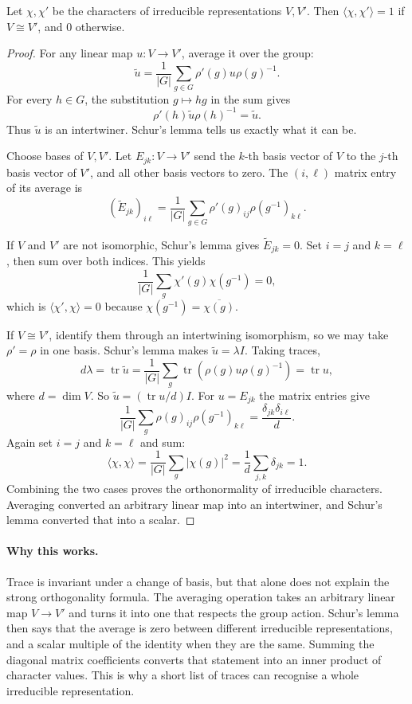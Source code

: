 \begin{theorem}\label{thm:orth}
Let $\chi,\chi'$ be the characters of irreducible representations $V,V'$. Then $\langle\chi,\chi'\rangle=1$ if $V\cong V'$, and $0$ otherwise.
\end{theorem}
\begin{proof}
For any linear map $u:V\to V'$, average it
over the group:
\[
\widetilde u=\frac1{|G|}
\sum_{g\in G}\rho'(g)u\rho(g)^{-1}.
\]
For every $h\in G$, the substitution
$g\mapsto hg$ in the sum gives
\[
\rho'(h)\widetilde u\rho(h)^{-1}=\widetilde u.
\]
Thus $\widetilde u$ is an intertwiner.
Schur's lemma tells us exactly what
it can be.

Choose bases of $V,V'$.
Let $E_{jk}:V\to V'$ send the $k$-th
basis vector of $V$ to the $j$-th
basis vector of $V'$, and all other
basis vectors to zero.
The $(i,\ell)$ matrix entry of its
average is
\[
(\widetilde E_{jk})_{i\ell}
=\frac1{|G|}\sum_{g\in G}
\rho'(g)_{ij}\rho(g^{-1})_{k\ell}.
\]

If $V$ and $V'$ are not isomorphic,
Schur's lemma gives
$\widetilde E_{jk}=0$.
Set $i=j$ and $k=\ell$, then sum
over both indices. This yields
\[
\frac1{|G|}\sum_g
\chi'(g)\chi(g^{-1})=0,
\]
which is $\langle\chi',\chi\rangle=0$
because $\chi(g^{-1})=\overline{\chi(g)}$.

If $V\cong V'$, identify them through
an intertwining isomorphism, so we
may take $\rho'=\rho$ in one basis.
Schur's lemma makes
$\widetilde u=\lambda I$. Taking traces,
\[
d\lambda=\operatorname{tr}\widetilde u
=\frac1{|G|}\sum_g
\operatorname{tr}(\rho(g)u\rho(g)^{-1})
=\operatorname{tr}u,
\]
where $d=\dim V$.
So $\widetilde u=(\operatorname{tr}u/d)I$.
For $u=E_{jk}$ the matrix entries give
\[
\frac1{|G|}\sum_g
\rho(g)_{ij}\rho(g^{-1})_{k\ell}
=\frac{\delta_{jk}\delta_{i\ell}}d.
\]
Again set $i=j$ and $k=\ell$ and sum:
\[
\langle\chi,\chi\rangle
=\frac1{|G|}\sum_g|\chi(g)|^2
=\frac1d\sum_{j,k}\delta_{jk}=1.
\]
Combining the two cases proves
the orthonormality of irreducible
characters. Averaging converted
an arbitrary linear map into an
intertwiner, and Schur's lemma
converted that into a scalar.
\end{proof}

\paragraph{Why this works.}
Trace is invariant under a change of basis, but that alone does not explain the strong orthogonality formula. The averaging operation takes an arbitrary linear map $V\to V'$ and turns it into one that respects the group action. Schur's lemma then says that the average is zero between different irreducible representations, and a scalar multiple of the identity when they are the same. Summing the diagonal matrix coefficients converts that statement into an inner product of character values. This is why a short list of traces can recognise a whole irreducible representation.

